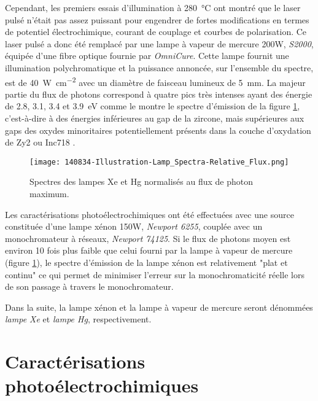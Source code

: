 \begin{refsection}
    Cependant, les premiers essais d'illumination à \SI{280}{\degreeCelsius} ont montré que le laser pulsé n'était
    pas assez puissant pour engendrer de fortes modifications en termes de potentiel électrochimique, courant de couplage
    et courbes de polarisation. Ce laser pulsé a donc été remplacé par une lampe à vapeur de mercure 200W, \emph{S2000}, équipée d'une fibre optique
    fournie par \emph{OmniCure}. Cette lampe fournit une illumination polychromatique et la puissance annoncée, sur l'ensemble du spectre, est de \SI{40}{\watt\per\square\centi\meter}
    avec un diamètre de faisceau lumineux de \SI{5}{\milli\meter}. 
    La majeur partie du flux de photons correspond à quatre pics très intenses ayant des énergie de 2.8, 3.1, 3.4 et
    \SI{3.9}{\electronvolt} comme le montre le spectre d'émission de la figure
    \ref{fig:ch3_lamp_spectra_relative_vs_Hg},
    c'est-à-dire à des énergies inférieures au gap de la zircone, mais supérieures aux
    gaps des oxydes minoritaires potentiellement présents dans la couche d'oxydation de Zy2 ou Inc718 \citep{Benaboud2007}.

    \begin{figure}[H]
		\centering
		\texttt{[image: 140834-Illustration-Lamp\_Spectra-Relative\_Flux.png]}
		\caption{Spectres des lampes Xe et Hg normalisés au flux de photon maximum.}
		\label{fig:ch3_lamp_spectra_relative_vs_Hg}
	\end{figure}

    Les caractérisations photoélectrochimiques ont été effectuées avec une source constituée d'une lampe xénon 150W, 
    \emph{Newport 6255}, couplée
    avec un monochromateur à réseaux, \emph{Newport 74125}. 
    Si le flux de photons moyen est environ 10 fois plus faible que celui fourni par la lampe à vapeur de mercure
    (figure \ref{fig:ch3_lamp_spectra_relative_vs_Hg}), le spectre d'émission de la lampe xénon
    est relativement "plat et continu" ce qui permet de minimiser l'erreur sur la monochromaticité réelle lors de son
    passage à travers le monochromateur.

    Dans la suite, la lampe xénon et la lampe à vapeur de mercure seront dénommées \emph{lampe Xe} et \emph{lampe Hg}, respectivement.





\section{Caractérisations photoélectrochimiques}\label{sec:ch3_PEC}


\end{refsection}
